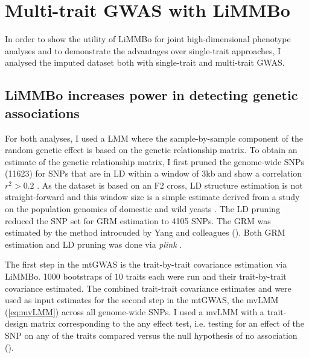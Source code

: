 \newpage
\section{Multi-trait GWAS with LiMMBo}
In order to show the utility of LiMMBo for joint high-dimensional phenotype analyses and to demonstrate the advantages over single-trait approaches, I analysed the imputed dataset both with single-trait and multi-trait GWAS. 

\subsection{LiMMBo increases power in detecting genetic associations}
For both analyses, I used a LMM where the sample-by-sample component of the random genetic effect is based on the genetic relationship matrix. To obtain an estimate of the genetic relationship matrix, I first pruned the genome-wide SNPs (\num{11623}) for SNPs that are in LD within a window of 3kb and show a correlation \(r^2 > 0.2\) . As the dataset is based on an F2 cross, LD structure estimation is not straight-forward and this window size is a simple estimate derived from a study on the population genomics of domestic and wild yeasts \citep{Liti2009}. The LD pruning reduced the SNP set for GRM estimation to \num{4105} SNPs. The GRM was estimated by the method introcuded by Yang and colleagues \citep{Yang2011} (). Both GRM estimation and LD pruning was done via \textit{plink} \cite{Chang2015}.

The first step in the mtGWAS is the trait-by-trait covariance estimation via LiMMBo. \num{1000} bootstraps of \num{10} traits each were run and their trait-by-trait covariance estimated. The combined trait-trait covariance estimates  and  were used as input estimates for the second step in the mtGWAS, the mvLMM  (\cref{eq:mvLMM}) across all genome-wide SNPs.  I used a mvLMM with a trait-design matrix corresponding to the any effect test, i.e. testing for an effect of the SNP on any of the traits compared versus the null hypothesis of no association ().


